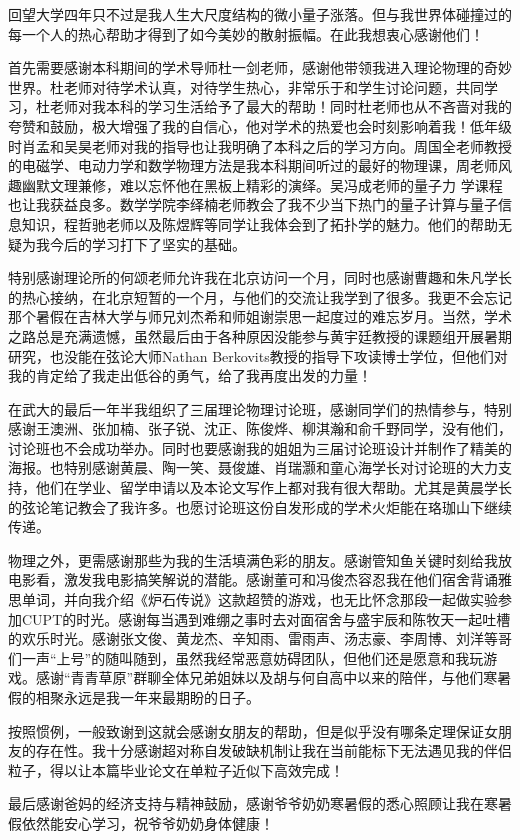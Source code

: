 \begin{acknowledgements}
	回望大学四年只不过是我人生大尺度结构的微小量子涨落。但与我世界体碰撞过的每一个人的热心帮助才得到了如今美妙的散射振幅。在此我想衷心感谢他们！
	
	首先需要感谢本科期间的学术导师杜一剑老师，感谢他带领我进入理论物理的奇妙世界。杜老师对待学术认真，对待学生热心，非常乐于和学生讨论问题，共同学习，杜老师对我本科的学习生活给予了最大的帮助！同时杜老师也从不吝啬对我的夸赞和鼓励，极大增强了我的自信心，他对学术的热爱也会时刻影响着我！低年级时肖孟和吴昊老师对我的指导也让我明确了本科之后的学习方向。周国全老师教授的电磁学、电动力学和数学物理方法是我本科期间听过的最好的物理课，周老师风趣幽默文理兼修，难以忘怀他在黑板上精彩的演绎。吴冯成老师的量子力 学课程也让我获益良多。数学学院李绎楠老师教会了我不少当下热门的量子计算与量子信息知识，程哲驰老师以及陈煜辉等同学让我体会到了拓扑学的魅力。他们的帮助无疑为我今后的学习打下了坚实的基础。
	
	特别感谢理论所的何颂老师允许我在北京访问一个月，同时也感谢曹趣和朱凡学长的热心接纳，在北京短暂的一个月，与他们的交流让我学到了很多。我更不会忘记那个暑假在吉林大学与师兄刘杰希和师姐谢崇思一起度过的难忘岁月。当然，学术之路总是充满遗憾，虽然最后由于各种原因没能参与黄宇廷教授的课题组开展暑期研究，也没能在弦论大师Nathan Berkovits教授的指导下攻读博士学位，但他们对我的肯定给了我走出低谷的勇气，给了我再度出发的力量！
	
	在武大的最后一年半我组织了三届理论物理讨论班，感谢同学们的热情参与，特别感谢王澳洲、张加楠、张子锐、沈正、陈俊烨、柳淇瀚和俞千野同学，没有他们，讨论班也不会成功举办。同时也要感谢我的姐姐为三届讨论班设计并制作了精美的海报。也特别感谢黄晨、陶一笑、聂俊雄、肖瑞灏和童心海学长对讨论班的大力支持，他们在学业、留学申请以及本论文写作上都对我有很大帮助。尤其是黄晨学长的弦论笔记教会了我许多。也愿讨论班这份自发形成的学术火炬能在珞珈山下继续传递。
	
	物理之外，更需感谢那些为我的生活填满色彩的朋友。感谢管知鱼关键时刻给我放电影看，激发我电影搞笑解说的潜能。感谢董可和冯俊杰容忍我在他们宿舍背诵雅思单词，并向我介绍《炉石传说》这款超赞的游戏，也无比怀念那段一起做实验参加CUPT的时光。感谢每当遇到难绷之事时去对面宿舍与盛宇辰和陈牧天一起吐槽的欢乐时光。感谢张文俊、黄龙杰、辛知雨、雷雨声、汤志豪、李周博、刘洋等哥们一声“上号”的随叫随到，虽然我经常恶意妨碍团队，但他们还是愿意和我玩游戏。感谢“青青草原”群聊全体兄弟姐妹以及胡与何自高中以来的陪伴，与他们寒暑假的相聚永远是我一年来最期盼的日子。
	
	按照惯例，一般致谢到这就会感谢女朋友的帮助，但是似乎没有哪条定理保证女朋友的存在性。我十分感谢超对称自发破缺机制让我在当前能标下无法遇见我的伴侣粒子，得以让本篇毕业论文在单粒子近似下高效完成！
	
	最后感谢爸妈的经济支持与精神鼓励，感谢爷爷奶奶寒暑假的悉心照顾让我在寒暑假依然能安心学习，祝爷爷奶奶身体健康！
\end{acknowledgements}
